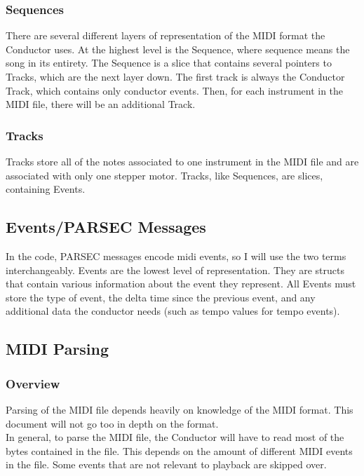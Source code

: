 \documentclass{article}
\begin{document}
\subsubsection{Sequences}
\noindent There are several different layers of representation of the MIDI format the Conductor uses. At the highest level is the Sequence, where sequence means the song in its entirety. The Sequence is a slice that contains several pointers to Tracks, which are the next layer down. The first track is always the Conductor Track, which contains only conductor events. Then, for each instrument in the MIDI file, there will be an additional Track.

\subsubsection{Tracks}
\noindent Tracks store all of the notes associated to one instrument in the MIDI file and are associated with only one stepper motor. Tracks, like Sequences, are slices, containing Events. 

\subsection{Events/PARSEC Messages}
\noindent In the code, PARSEC messages encode midi events, so I will use the two terms interchangeably. Events are the lowest level of representation. They are structs that contain various information about the event they represent. All Events must store the type of event, the delta time since the previous event, and any additional data the conductor needs (such as tempo values for tempo events).

\subsection{MIDI Parsing}
\subsubsection{Overview}
\noindent Parsing of the MIDI file depends heavily on knowledge of the MIDI format. This document will not go too in depth on the format.\\

\noindent In general, to parse the MIDI file, the Conductor will have to read most of the bytes contained in the file. This depends on the amount of different MIDI events in the file. Some events that are not relevant to playback are skipped over.\\
\end{document}
